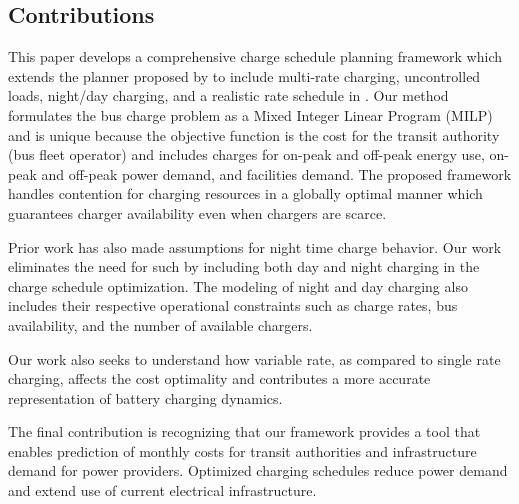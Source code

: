 \subsection{Contributions}
This paper develops a comprehensive charge schedule planning framework which extends the planner proposed by \cite{whitaker_network_2021} to include multi-rate charging, uncontrolled loads, night/day charging, and a realistic rate schedule in \cite{noauthor_rocky_nodate}. Our method formulates the bus charge problem as a Mixed Integer Linear Program (MILP) and is unique because the objective function is the cost for the transit authority (bus fleet operator) and includes charges for on-peak and off-peak energy use, on-peak and off-peak power demand, and facilities demand. The proposed framework handles contention for charging resources in a globally optimal manner which guarantees charger availability even when chargers are scarce.
\par Prior work has also made assumptions for night time charge behavior. Our work eliminates the need for such by including both day and night charging in the charge schedule optimization. The modeling of night and day charging also includes their respective operational constraints such as charge rates, bus availability, and the number of available chargers.
\par Our work also seeks to understand how variable rate, as compared to single rate charging, affects the cost optimality and contributes a more accurate representation of battery charging dynamics. 
\par The final contribution is recognizing that our framework provides a tool that enables prediction of monthly costs for transit authorities and infrastructure demand for power providers.  Optimized charging schedules reduce power demand and extend use of current electrical infrastructure.

